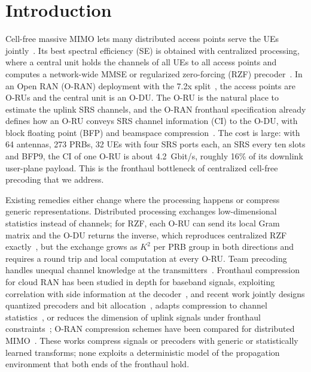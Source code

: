\documentclass[journal]{IEEEtran}
\begin{document}
\section{Introduction}

Cell-free massive MIMO lets many distributed access points serve the UEs jointly~\cite{ngo2017cellfree,interdonato2019ubiquitous}. Its best spectral efficiency (SE) is obtained with centralized processing, where a central unit holds the channels of all UEs to all access points and computes a network-wide MMSE or regularized zero-forcing (RZF) precoder~\cite{bjornson2020making}. In an Open RAN (O-RAN) deployment with the 7.2x split~\cite{polese2023oran}, the access points are O-RUs and the central unit is an O-DU. The O-RU is the natural place to estimate the uplink SRS channels, and the O-RAN fronthaul specification already defines how an O-RU conveys SRS channel information (CI) to the O-DU, with block floating point (BFP) and beamspace compression~\cite{oran_cus_v22}. The cost is large: with 64 antennas, 273 PRBs, 32 UEs with four SRS ports each, an SRS every ten slots and BFP9, the CI of one O-RU is about 4.2~Gbit/s, roughly 16\% of its downlink user-plane payload. This is the fronthaul bottleneck of centralized cell-free precoding that we address.

Existing remedies either change where the processing happens or compress generic representations. Distributed processing exchanges low-dimensional statistics instead of channels; for RZF, each O-RU can send its local Gram matrix and the O-DU returns the inverse, which reproduces centralized RZF exactly~\cite{li2017decentralized}, but the exchange grows as $K^2$ per PRB group in both directions and requires a round trip and local computation at every O-RU. Team precoding handles unequal channel knowledge at the transmitters~\cite{miretti2022team}. Fronthaul compression for cloud RAN has been studied in depth for baseband signals, exploiting correlation with side information at the decoder~\cite{park2013joint,park2014fronthaul}, and recent work jointly designs quantized precoders and bit allocation~\cite{demir2026jointquant}, adapts compression to channel statistics~\cite{li2025adaptive}, or reduces the dimension of uplink signals under fronthaul constraints~\cite{kim2026fronthaul}; O-RAN compression schemes have been compared for distributed MIMO~\cite{rahmani2025oran,lagen2021modcomp}. These works compress signals or precoders with generic or statistically learned transforms; none exploits a deterministic model of the propagation environment that both ends of the fronthaul hold.
\end{document}
